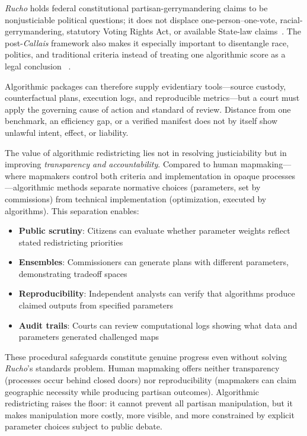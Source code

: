 \emph{Rucho} holds federal constitutional partisan-gerrymandering claims to be
nonjusticiable political questions; it does not displace one-person--one-vote,
racial-gerrymandering, statutory Voting Rights Act, or available State-law
claims~\cite{rucho2019}. The post-\emph{Callais} framework also makes it
especially important to disentangle race, politics, and traditional criteria
instead of treating one algorithmic score as a legal conclusion
~\cite{callais2026}.

Algorithmic packages can therefore supply evidentiary tools---source custody,
counterfactual plans, execution logs, and reproducible metrics---but a court
must apply the governing cause of action and standard of review. Distance from
one benchmark, an efficiency gap, or a verified manifest does not by itself
show unlawful intent, effect, or liability.

The value of algorithmic redistricting lies not in resolving justiciability but in improving \emph{transparency and accountability}. Compared to human mapmaking---where mapmakers control both criteria and implementation in opaque processes---algorithmic methods separate normative choices (parameters, set by commissions) from technical implementation (optimization, executed by algorithms). This separation enables:

\begin{itemize}
\item \textbf{Public scrutiny}: Citizens can evaluate whether parameter weights reflect stated redistricting priorities
\item \textbf{Ensembles}: Commissioners can generate plans with different parameters, demonstrating tradeoff spaces
\item \textbf{Reproducibility}: Independent analysts can verify that algorithms produce claimed outputs from specified parameters
\item \textbf{Audit trails}: Courts can review computational logs showing what data and parameters generated challenged maps
\end{itemize}

These procedural safeguards constitute genuine progress even without solving \emph{Rucho}'s standards problem. Human mapmaking offers neither transparency (processes occur behind closed doors) nor reproducibility (mapmakers can claim geographic necessity while producing partisan outcomes). Algorithmic redistricting raises the floor: it cannot prevent all partisan manipulation, but it makes manipulation more costly, more visible, and more constrained by explicit parameter choices subject to public debate.

